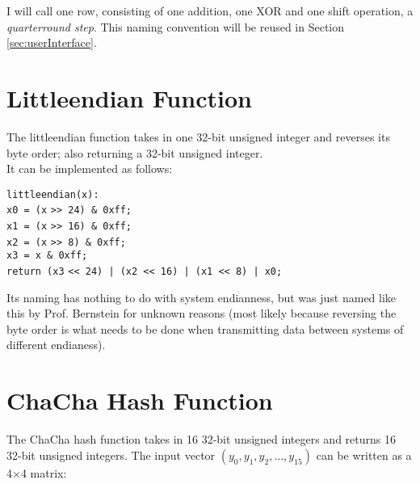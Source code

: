 I will call one row, consisting of one addition, one XOR and one shift operation, a \textit{quarterround step}. This naming convention will be reused in Section \ref{sec:userInterface}.

\section{Littleendian Function}
\label{sec:chacha.littleendian}

The littleendian function takes in one 32-bit unsigned integer and reverses its byte order; also returning a 32-bit unsigned integer.  \\
It can be implemented as follows:

\begin{center}
\begin{minipage}{0.8\linewidth}
\texttt{littleendian(x):} \\
\hspace*{1em}\texttt{x0 = (x} \verb|>>|\texttt{ 24) \& 0xff;} \\
\hspace*{1em}\texttt{x1 = (x} \verb|>>|\texttt{ 16) \& 0xff;} \\
\hspace*{1em}\texttt{x2 = (x} \verb|>>|\texttt{ 8) \& 0xff;} \\
\hspace*{1em}\texttt{x3 = x \& 0xff;} \\
\hspace*{1em}\texttt{return (x3} \verb|<<|\texttt{ 24) | (x2 }\verb|<<|\texttt{ 16) | (x1 }\verb|<<|\texttt{ 8) | x0;}
\end{minipage}
\end{center}

\begin{remark}
Its naming has nothing to do with system endianness, but was just named like this by Prof. Bernstein for unknown reasons (most likely because reversing the byte order is what needs to be done when transmitting data between systems of different endianess).
\end{remark}

\section{ChaCha Hash Function}
\label{sec:chacha.hash}

The ChaCha hash function takes in 16 32-bit unsigned integers and returns 16 32-bit unsigned integers. The input vector $(y_0, y_1, y_2, \dots, y_{15})$ can be written as a 4$\times$4 matrix:

